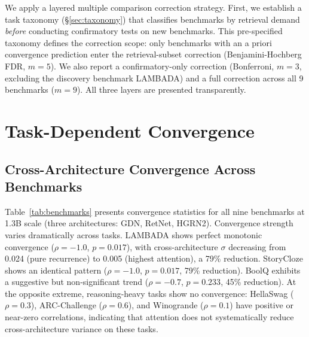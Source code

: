 \documentclass[11pt]{article}
\begin{document}
We apply a layered multiple comparison correction strategy.
First, we establish a task taxonomy (\S\ref{sec:taxonomy}) that classifies benchmarks by retrieval demand \textit{before} conducting confirmatory tests on new benchmarks.
This pre-specified taxonomy defines the correction scope: only benchmarks with an a priori convergence prediction enter the retrieval-subset correction (Benjamini-Hochberg FDR, $m = 5$).
We also report a confirmatory-only correction (Bonferroni, $m = 3$, excluding the discovery benchmark LAMBADA) and a full correction across all 9 benchmarks ($m = 9$).
All three layers are presented transparently.

\section{Task-Dependent Convergence}
\label{sec:convergence}

\subsection{Cross-Architecture Convergence Across Benchmarks}

Table~\ref{tab:benchmarks} presents convergence statistics for all nine benchmarks at 1.3B scale (three architectures: GDN, RetNet, HGRN2).
Convergence strength varies dramatically across tasks.
LAMBADA shows perfect monotonic convergence ($\rho = {-}1.0$, $p = 0.017$), with cross-architecture $\sigma$ decreasing from 0.024 (pure recurrence) to 0.005 (highest attention), a 79\% reduction.
StoryCloze shows an identical pattern ($\rho = {-}1.0$, $p = 0.017$, 79\% reduction).
BoolQ exhibits a suggestive but non-significant trend ($\rho = {-}0.7$, $p = 0.233$, 45\% reduction).
At the opposite extreme, reasoning-heavy tasks show no convergence: HellaSwag ($\rho = 0.3$), ARC-Challenge ($\rho = 0.6$), and Winogrande ($\rho = 0.1$) have positive or near-zero correlations, indicating that attention does not systematically reduce cross-architecture variance on these tasks.
\end{document}
